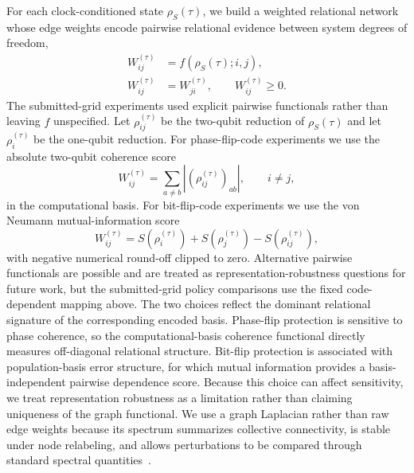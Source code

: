 \documentclass{iopjournal}
\begin{document}
For each clock-conditioned state $\rho_S(\tau)$, we build a weighted relational
network whose edge weights encode pairwise relational evidence between system
degrees of freedom,
\begin{equation}
\begin{aligned}
W^{(\tau)}_{ij}
&=
f(\rho_S(\tau);i,j),\\
W^{(\tau)}_{ij}
&=
W^{(\tau)}_{ji},
\qquad
W^{(\tau)}_{ij}\ge 0.
\end{aligned}
\end{equation}
The submitted-grid experiments used explicit pairwise functionals rather than leaving
$f$ unspecified. Let $\rho_{ij}^{(\tau)}$ be the two-qubit reduction of
$\rho_S(\tau)$ and let $\rho_i^{(\tau)}$ be the one-qubit reduction. For
phase-flip-code experiments we use the absolute two-qubit coherence score
\begin{equation}
W^{(\tau)}_{ij}
=
\sum_{a\ne b}
\left|(\rho_{ij}^{(\tau)})_{ab}\right|,
\qquad i\ne j,
\label{eq:coherence-weight-main}
\end{equation}
in the computational basis. For bit-flip-code experiments we use the von Neumann
mutual-information score
\begin{equation}
W^{(\tau)}_{ij}
=
S(\rho_i^{(\tau)})
+
S(\rho_j^{(\tau)})
-
S(\rho_{ij}^{(\tau)}),
\label{eq:mutual-info-weight-main}
\end{equation}
with negative numerical round-off clipped to zero. Alternative pairwise
functionals are possible and are treated as representation-robustness questions
for future work, but the submitted-grid policy comparisons use the fixed code-dependent
mapping above.
The two choices reflect the dominant relational signature of the corresponding
encoded basis. Phase-flip protection is sensitive to phase coherence, so the
computational-basis coherence functional directly measures off-diagonal
relational structure. Bit-flip protection is associated with population-basis
error structure, for which mutual information provides a basis-independent
pairwise dependence score. Because this choice can affect
sensitivity, we treat representation robustness as a limitation rather than
claiming uniqueness of the graph functional.
We use a graph Laplacian rather than raw edge weights because its
spectrum summarizes collective connectivity, is stable under node relabeling, and
allows perturbations to be compared through standard spectral
quantities~\cite{JiangSpectralGraphTheory,Braunstein2006GraphLaplacianDensityMatrix,Adhikari2017WeightedDigraphsQuantumStates}.
\end{document}

